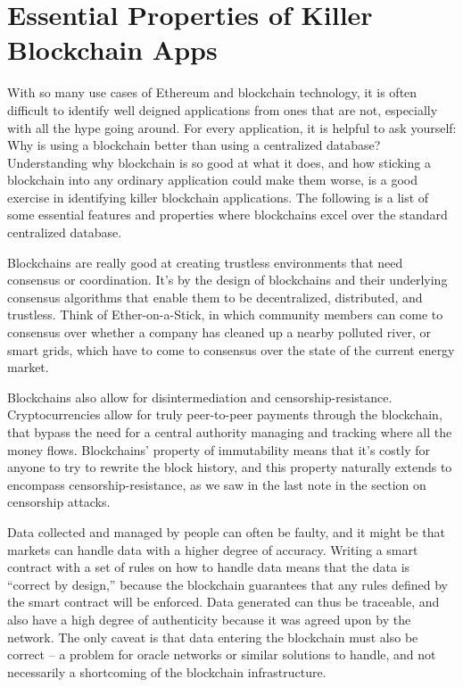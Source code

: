 \documentclass[full.tex]{subfiles}
\begin{document}
    \section*{Essential Properties of Killer Blockchain Apps}
    
    With so many use cases of Ethereum and blockchain technology, it is often difficult to identify well deigned applications from ones that are not, especially with all the hype going around. For every application, it is helpful to ask yourself: Why is using a blockchain better than using a centralized database? Understanding why blockchain is so good at what it does, and how sticking a blockchain into any ordinary application could make them worse, is a good exercise in identifying killer blockchain applications. The following is a list of some essential features and properties where blockchains excel over the standard centralized database.
    
    Blockchains are really good at creating trustless environments that need consensus or coordination. It's by the design of blockchains and their underlying consensus algorithms that enable them to be decentralized, distributed, and trustless. Think of Ether-on-a-Stick, in which community members can come to consensus over whether a company has cleaned up a nearby polluted river, or smart grids, which have to come to consensus over the state of the current energy market. 
    
    Blockchains also allow for disintermediation and censorship-resistance. Cryptocurrencies allow for truly peer-to-peer payments through the blockchain, that bypass the need for a central authority managing and tracking where all the money flows. Blockchains' property of immutability means that it's costly for anyone to try to rewrite the block history, and this property naturally extends to encompass censorship-resistance, as we saw in the last note in the section on censorship attacks.  
    
    Data collected and managed by people can often be faulty, and it might be that markets can handle data with a higher degree of accuracy. Writing a smart contract with a set of rules on how to handle data means that the data is ``correct by design,'' because the blockchain guarantees that any rules defined by the smart contract will be enforced. Data generated can thus be traceable, and also have a high degree of authenticity because it was agreed upon by the network. The only caveat is that data entering the blockchain must also be correct -- a problem for oracle networks or similar solutions to handle, and not necessarily a shortcoming of the blockchain infrastructure.
    
\end{document}
